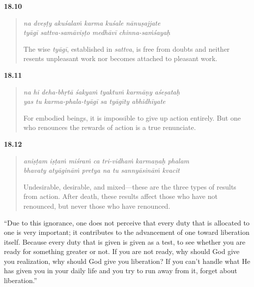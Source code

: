 \par\noindent\textbf{18.10}\par
\begin{verse}
\textit{na dveṣṭy akuśalaṁ karma kuśale nānuṣajjate} \\
\textit{tyāgī sattva-samāviṣṭo medhāvī chinna-saṁśayaḥ}

\noindent The wise \textit{tyāgī}, established in \textit{sattva}, is free from doubts and neither resents unpleasant work nor becomes attached to pleasant work.
\end{verse}
\par



\par\noindent\textbf{18.11}\par
\begin{verse}
\textit{na hi deha-bhṛtā śakyaṁ tyaktuṁ karmāṇy aśeṣataḥ} \\
\textit{yas tu karma-phala-tyāgī sa tyāgīty abhidhīyate}

\noindent For embodied beings, it is impossible to give up action entirely. But one who renounces the rewards of action is a true renunciate.
\end{verse}
\par



\par\noindent\textbf{18.12}\par
\begin{verse}
\textit{aniṣṭam iṣṭaṁ miśraṁ ca tri-vidhaṁ karmaṇaḥ phalam} \\
\textit{bhavaty atyāgināṁ pretya na tu sannyāsināṁ kvacit}

\noindent Undesirable, desirable, and mixed---these are the three types of results from action. After death, these results affect those who have not renounced, but never those who have renounced.
\end{verse}
\par


\enquote{Due to this ignorance, one does not perceive that every duty that is allocated to one is very important; it contributes to the advancement of one toward liberation itself. Because every duty that is given is given as a test, to see whether you are ready for something greater or not. If you are not ready, why should God give you realization, why should God give you liberation? If you can’t handle what He has given you in your daily life and you try to run away from it, forget about liberation.}

